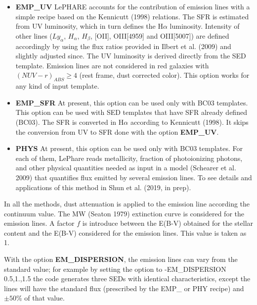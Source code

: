 \documentclass[12pt]{article}
\begin{document}
\begin{itemize}

\item \textbf{EMP\_UV} LePHARE accounts for the contribution of emission lines with a simple recipe based on the Kennicutt (1998) relations.  The SFR is estimated from  UV luminosity, which in turn defines the H$\alpha$ luminosity. Intensity of other lines ($Ly_{\alpha}$, $H_{\alpha}$, $H_{\beta}$, [OII],
 OIII[4959]  and OIII[5007]) are defined accordingly by using the flux ratios provided in Ilbert et al. (2009) and slightly adjusted since. 
 The UV luminosity is derived directly from the SED template.  Emission lines are not considered in red galaxies with $(NUV-r)_{ABS}\ge 4$ (rest frame, dust corrected color). This option works for any kind of input template. 
 
\item \textbf{EMP\_SFR} At present, this option can be used only with BC03 templates. This option can be used with SED templates that have SFR already defined (BC03). The SFR is converted in H$\alpha$ according to Kennicutt (1998). It skips the conversion from UV to SFR done with the option \textbf{EMP\_UV}.

\item \textbf{PHYS} At present, this option can be used only with BC03 templates. For each of them, LePhare reads metallicity, fraction of photoionizing photons, and other physical quantities needed as input in a model (Schearer et al. 2009)  that quantifies flux emitted by several emission lines. To see details and applications of this method in Shun et al. (2019, in prep).  


\end{itemize}

In all the methods, dust attenuation is applied to the emission line according the continuum value. The MW (Seaton 1979) extinction curve is considered for the emission lines. A factor $f$ is introduce between the E(B-V) obtained for the stellar content and the E(B-V) considered for the emission lines. This value is taken as 1.

With the option \textbf{EM\_DISPERSION}, the emission lines can vary from the standard value; for example by setting the option to -EM\_DISPERSION  0.5,1.,1.5 the code generates three SEDs with identical characteristics, except the lines will have the standard flux (prescribed by the EMP\_ or PHY recipe) and $\pm50\%$ of that value. 
\end{document}
